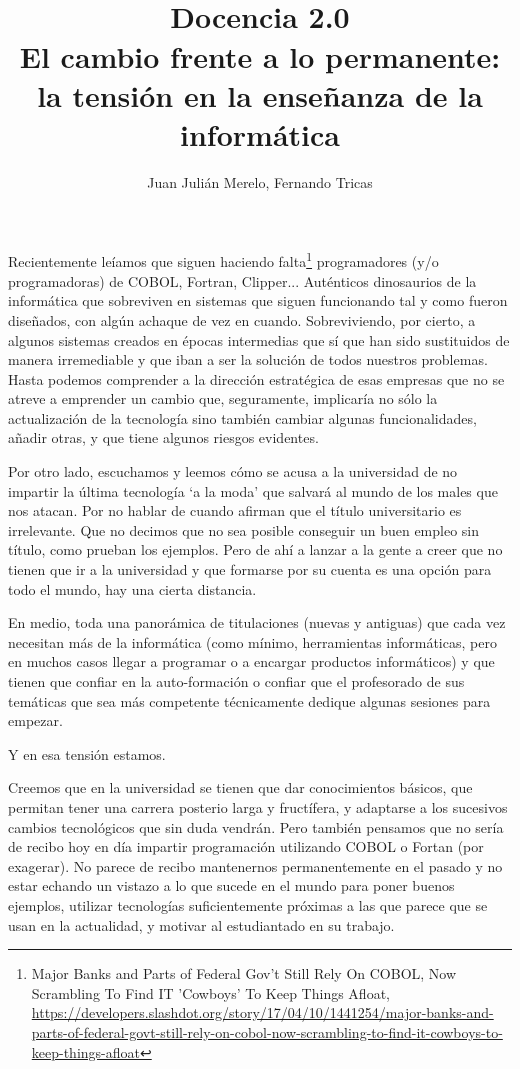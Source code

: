 \documentclass[twoside,10pt]{article}
\title{\ \\ Docencia 2.0\\ \LARGE El cambio frente a lo permanente: la tensión en la enseñanza de la informática}
\author{\large Juan Julián Merelo, Fernando Tricas}
\date{}
\begin{document}
\addtocounter{page}{2}

\maketitle
\vspace*{-5ex}

\begin{multicols}{2}

	Recientemente leíamos que siguen haciendo falta\footnote{Major Banks and Parts of Federal Gov't Still Rely On COBOL, Now Scrambling To Find IT 'Cowboys' To Keep Things Afloat, \url{https://developers.slashdot.org/story/17/04/10/1441254/major-banks-and-parts-of-federal-govt-still-rely-on-cobol-now-scrambling-to-find-it-cowboys-to-keep-things-afloat}} programadores (y/o programadoras) de COBOL, Fortran, Clipper... Auténticos dinosaurios de la informática que sobreviven en sistemas que siguen funcionando tal y como fueron diseñados, con algún achaque de vez en cuando. 
Sobreviviendo, por cierto, a algunos sistemas creados en épocas intermedias que sí que han sido sustituidos de manera irremediable y que iban a ser la solución de todos nuestros problemas.
Hasta podemos comprender a la dirección estratégica de esas empresas que no se atreve a emprender un cambio que, seguramente, implicaría no sólo la actualización de la tecnología sino también cambiar algunas funcionalidades, añadir otras, y que tiene algunos riesgos evidentes.

Por otro lado, escuchamos y leemos cómo se acusa a la universidad de no impartir la última tecnología `a la moda' que salvará al mundo de los males que nos atacan.
Por no hablar de cuando afirman que el título universitario es irrelevante. Que no decimos que no sea posible conseguir un buen empleo sin título, como prueban los ejemplos. Pero de ahí a lanzar a la gente a creer que no tienen que ir a la universidad y que formarse por su cuenta es una opción para todo el mundo, hay una cierta distancia.

	En medio, toda una panorámica de titulaciones (nuevas y antiguas) que cada vez necesitan más de la informática (como mínimo, herramientas informáticas, pero en muchos casos llegar a programar o a encargar productos informáticos) y que tienen que confiar en la auto-formación o confiar que el profesorado de sus temáticas que sea más competente técnicamente dedique algunas sesiones para empezar.

Y en esa tensión estamos.

Creemos que en la universidad se tienen que dar conocimientos básicos, que permitan tener una carrera posterio larga y fructífera, y adaptarse a los sucesivos cambios tecnológicos que sin duda vendrán.
	Pero también pensamos que no sería de recibo hoy en día impartir programación utilizando COBOL o Fortan (por exagerar). No parece de recibo mantenernos permanentemente en el pasado y no estar echando un vistazo a lo que sucede en el mundo para poner buenos ejemplos, utilizar tecnologías suficientemente próximas a las que parece que se usan en la actualidad, y motivar al estudiantado en su trabajo.


\end{multicols}
\end{document}
